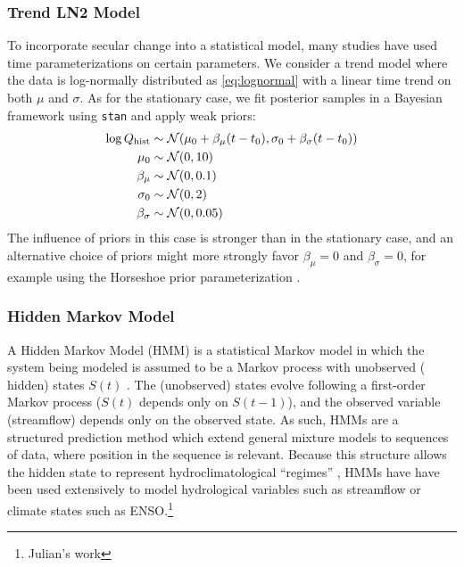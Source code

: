 \documentclass[12pt]{article}
\begin{document}
\subsubsection{Trend LN2 Model\label{sec:method-trend}}

To incorporate secular change into a statistical model, many studies have used time parameterizations on certain parameters.
We consider a trend model where the data is log-normally distributed as \cref{eq:lognormal} with a linear time trend on both \( \mu \) and \( \sigma \).
As for the stationary case, we fit posterior samples in a Bayesian framework using \texttt{stan} and apply weak priors:
\begin{align}
  \log Q_\text{hist} & \sim \mathcal{N} \qty(\mu_0 + \beta_\mu \qty(t - t_0), \sigma_0 + \beta_\sigma \qty(t-t_0)) \\
  \mu_0 & \sim \mathcal{N} \qty(0, 10) \\
  \beta_\mu & \sim \mathcal{N} \qty(0, 0.1) \\
  \sigma_0 & \sim \mathcal{N} \qty(0, 2) \\
  \beta_\sigma & \sim \mathcal{N} \qty(0, 0.05)
\end{align}
The influence of priors in this case is stronger than in the stationary case, and an alternative choice of priors might more strongly favor \(\beta_\mu=0\) and \(\beta_\sigma=0\), for example using the Horseshoe prior parameterization \citep{Piironen2016a}.

\subsubsection{Hidden Markov Model\label{sec:method-HMM}}

A Hidden Markov Model (HMM) is a statistical Markov model in which the system being modeled is assumed to be a Markov process with unobserved (\ie{} hidden) states \(S(t)\) \citep{Rabiner1986}.
The (unobserved) states evolve following a first-order Markov process (\(S(t)\) depends only on \(S(t-1)\)), and the observed variable (streamflow) depends only on the observed state.
As such, HMMs are a structured prediction method which extend general mixture models to sequences of data, where position in the sequence is relevant.
Because this structure allows the hidden state to represent hydroclimatological ``regimes'' \citep{Reinhold1982,Michelangeli1995,Merz2014}, HMMs have have been used extensively to model hydrological variables such as streamflow \citep[\ie{}][]{Bracken2016} or climate states such as ENSO.\footnote{Julian's work}
\end{document}
